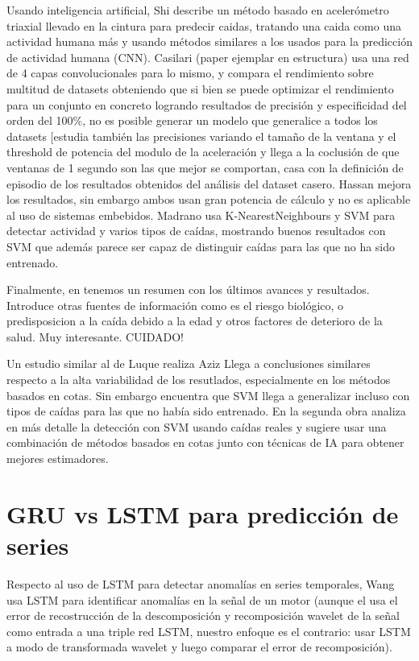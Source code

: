 \documentclass[../tfm.tex]{subfiles}
\begin{document}
Usando inteligencia artificial, Shi \cite{Shi2020} describe un método basado en acelerómetro triaxial llevado en la cintura para predecir caidas, tratando una caida como una actividad humana más y usando métodos similares a los usados para la predicción de actividad humana (CNN). Casilari (paper ejemplar en estructura) \cite{Casilari2020} usa una red de 4 capas convolucionales para lo mismo, y compara el rendimiento sobre multitud de datasets obteniendo que si bien se puede optimizar el rendimiento para un conjunto en concreto logrando resultados de precisión y especificidad del orden del 100\%, no es posible generar un modelo que generalice a todos los datasets [estudia también las precisiones variando el tamaño de la ventana y el threshold de potencia del modulo de la aceleración y llega a la coclusión de que ventanas de 1 segundo son las que mejor se comportan, casa con la definición de episodio de los resultados obtenidos del análisis del dataset casero. Hassan \cite{Hassan2019} mejora los resultados, sin embargo ambos usan gran potencia de cálculo y no es aplicable al uso de sistemas embebidos. Madrano \cite{tfall} usa K-NearestNeighbours y SVM para detectar actividad y varios tipos de caídas, mostrando buenos resultados con SVM que además parece ser capaz de distinguir caídas para las que no ha sido entrenado.



Finalmente, en \cite{Anita2020} tenemos un resumen con los últimos avances y resultados. Introduce otras fuentes de información como es el riesgo biológico, o predisposicion a la caída debido a la edad y otros factores de deterioro de la salud. Muy interesante. CUIDADO!

Un estudio similar al de Luque realiza Aziz\cite{Aziz2017,Aziz2017b} Llega a conclusiones similares respecto a la alta variabilidad de los resutlados, especialmente en los métodos basados en cotas. Sin embargo encuentra que SVM llega a generalizar incluso con tipos de caídas para las que no había sido entrenado. En la segunda obra analiza en más detalle la detección con SVM usando caídas reales y sugiere usar una combinación de métodos basados en cotas junto con técnicas de IA para obtener mejores estimadores.


\section{GRU vs LSTM para predicción de series}

Respecto al uso de LSTM para detectar anomalías en series temporales, Wang \cite{Wang2020} usa LSTM para identificar anomalías en la señal de un motor (aunque el usa el error de recostrucción de la descomposición y recomposición wavelet de la señal como entrada a una triple red LSTM, nuestro enfoque es el contrario: usar LSTM a modo de transformada wavelet y luego comparar el error de recomposición).
\end{document}
